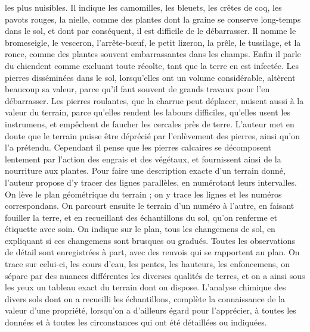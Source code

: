 les plus nuisibles. Il indique les camomilles, les bleuets, les crêtes de coq, les pavots rouges, la nielle, comme des plantes dont la graine se conserve long-temps dans le sol, et dont par conséquent, il est difficile de le débarrasser. Il nomme le bromeseigle, le vesceron, l'arrête-bœuf, le petit lizeron, la prêle, le tussilage, et la ronce, comme des plantes souvent embarrassantes dans les champs. Enfin il parle du chiendent comme excluant toute récolte, tant que la terre en est infectée.
Les pierres disséminées dans le sol, lorsqu'elles ont un volume considérable, altèrent beaucoup sa valeur, parce qu'il faut souvent de grands travaux pour l'en débarrasser. Les pierres roulantes, que la charrue peut déplacer, nuisent aussi à la valeur du terrain, parce qu'elles rendent les labours difficiles, qu'elles usent les instrumens, et empêchent de faucher les cercales près de terre. L'auteur met en doute que le terrain puisse être déprécié par l'enlèvement des pierres, ainsi qu'on l'a prétendu. Cependant il pense que les pierres calcaires se décomposent lentement par l'action des engrais et des végétaux, et fournissent ainsi de la nourriture aux plantes.\setcounter{page}{200} Pour faire une description exacte d'un terrain donné, l'auteur propose d'y tracer des lignes parallèles, en numérotant leurs intervalles. On lève le plan géométrique du terrain ; on y trace les lignes et les numéros correspondans. On parcourt ensuite le terrain d'un numéro à l'autre, en faisant fouiller la terre, et en recueillant des échantillons du sol, qu'on renferme et étiquette avec soin. On indique sur le plan, tous les changemens de sol, en expliquant si ces changemens sont brusques ou gradués. Toutes les observations de détail sont enregistrées à part, avec des renvois qui se rapportent au plan. On trace sur celui-ci, les cours d'eau, les pentes, les hauteurs, les enfoncemens, on sépare par des nuances différentes les diverses qualités de terres, et on a ainsi sous les yeux un tableau exact du terrain dont on dispose. L'analyse chimique des divers sols dont on a recueilli les échantillons, complète la connaissance de la valeur d'une propriété, lorsqu'on a d'ailleurs égard pour l'apprécier, à toutes les données et à toutes les circonstances qui ont été détaillées ou indiquées.
